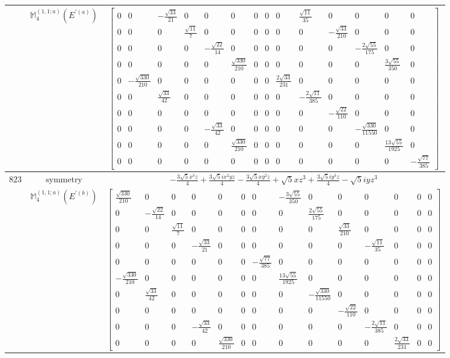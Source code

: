\documentclass[fleqn,8pt,landscape]{jsarticle}
\begin{document}
\begin{longtable}{ccc}
$  $ & $ \mathbb{M}_{4}^{(1,1;a)}(E^{\prime(a)}) $ & $ \begin{bmatrix} 0 & 0 & - \frac{\sqrt{33}}{21} & 0 & 0 & 0 & 0 & 0 & 0 & \frac{\sqrt{11}}{35} & 0 & 0 & 0 & 0 \\ 0 & 0 & 0 & \frac{\sqrt{11}}{7} & 0 & 0 & 0 & 0 & 0 & 0 & - \frac{\sqrt{33}}{210} & 0 & 0 & 0 \\ 0 & 0 & 0 & 0 & - \frac{\sqrt{22}}{14} & 0 & 0 & 0 & 0 & 0 & 0 & - \frac{2 \sqrt{55}}{175} & 0 & 0 \\ 0 & 0 & 0 & 0 & 0 & \frac{\sqrt{330}}{210} & 0 & 0 & 0 & 0 & 0 & 0 & \frac{3 \sqrt{55}}{350} & 0 \\ 0 & - \frac{\sqrt{330}}{210} & 0 & 0 & 0 & 0 & 0 & 0 & \frac{2 \sqrt{33}}{231} & 0 & 0 & 0 & 0 & 0 \\ 0 & 0 & \frac{\sqrt{33}}{42} & 0 & 0 & 0 & 0 & 0 & 0 & - \frac{2 \sqrt{11}}{385} & 0 & 0 & 0 & 0 \\ 0 & 0 & 0 & 0 & 0 & 0 & 0 & 0 & 0 & 0 & - \frac{\sqrt{22}}{110} & 0 & 0 & 0 \\ 0 & 0 & 0 & 0 & - \frac{\sqrt{33}}{42} & 0 & 0 & 0 & 0 & 0 & 0 & - \frac{\sqrt{330}}{11550} & 0 & 0 \\ 0 & 0 & 0 & 0 & 0 & \frac{\sqrt{330}}{210} & 0 & 0 & 0 & 0 & 0 & 0 & \frac{13 \sqrt{55}}{1925} & 0 \\ 0 & 0 & 0 & 0 & 0 & 0 & 0 & 0 & 0 & 0 & 0 & 0 & 0 & - \frac{\sqrt{77}}{385} \end{bmatrix} $ \\ \hline
$ 823 $ & $ \text{symmetry} $ & $ - \frac{3 \sqrt{5} x^{3} z}{4} + \frac{3 \sqrt{5} i x^{2} y z}{4} - \frac{3 \sqrt{5} x y^{2} z}{4} + \sqrt{5} x z^{3} + \frac{3 \sqrt{5} i y^{3} z}{4} - \sqrt{5} i y z^{3} $ \\
$  $ & $ \mathbb{M}_{4}^{(1,1;a)}(E^{\prime(b)}) $ & $ \begin{bmatrix} \frac{\sqrt{330}}{210} & 0 & 0 & 0 & 0 & 0 & 0 & - \frac{3 \sqrt{55}}{350} & 0 & 0 & 0 & 0 & 0 & 0 \\ 0 & - \frac{\sqrt{22}}{14} & 0 & 0 & 0 & 0 & 0 & 0 & \frac{2 \sqrt{55}}{175} & 0 & 0 & 0 & 0 & 0 \\ 0 & 0 & \frac{\sqrt{11}}{7} & 0 & 0 & 0 & 0 & 0 & 0 & \frac{\sqrt{33}}{210} & 0 & 0 & 0 & 0 \\ 0 & 0 & 0 & - \frac{\sqrt{33}}{21} & 0 & 0 & 0 & 0 & 0 & 0 & - \frac{\sqrt{11}}{35} & 0 & 0 & 0 \\ 0 & 0 & 0 & 0 & 0 & 0 & - \frac{\sqrt{77}}{385} & 0 & 0 & 0 & 0 & 0 & 0 & 0 \\ - \frac{\sqrt{330}}{210} & 0 & 0 & 0 & 0 & 0 & 0 & \frac{13 \sqrt{55}}{1925} & 0 & 0 & 0 & 0 & 0 & 0 \\ 0 & \frac{\sqrt{33}}{42} & 0 & 0 & 0 & 0 & 0 & 0 & - \frac{\sqrt{330}}{11550} & 0 & 0 & 0 & 0 & 0 \\ 0 & 0 & 0 & 0 & 0 & 0 & 0 & 0 & 0 & - \frac{\sqrt{22}}{110} & 0 & 0 & 0 & 0 \\ 0 & 0 & 0 & - \frac{\sqrt{33}}{42} & 0 & 0 & 0 & 0 & 0 & 0 & - \frac{2 \sqrt{11}}{385} & 0 & 0 & 0 \\ 0 & 0 & 0 & 0 & \frac{\sqrt{330}}{210} & 0 & 0 & 0 & 0 & 0 & 0 & \frac{2 \sqrt{33}}{231} & 0 & 0 \end{bmatrix} $ \\ \hline

\end{longtable}
\end{document}
